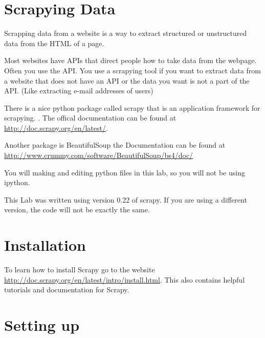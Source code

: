 
\section*{Scrapying Data}
Scrapping data from a website is a way to extract structured or unstructured data from the HTML of a page.

Most websites have APIs that direct people how to take data from the webpage. Often you use the API. You use a scrapying tool if you want to extract data from a website that does not have an API or the data you want is not a part of the API. (Like extracting e-mail addresses of users)

There is a nice python package called scrapy that is an application framework for scrapying. . The offical documentation can be found at \url{http://doc.scrapy.org/en/latest/}. 

Another package is BeautifulSoup the Documentation can be found at \url{http://www.crummy.com/software/BeautifulSoup/bs4/doc/}

\begin{info}
You will making and editing python files in this lab, so you will not be using ipython.
\end{info}

\begin{warn}
This Lab was written using version 0.22 of scrapy. 
If you are using a different version, the code will not be exactly the same.
\end{warn}

\section*{Installation}

To learn how to install Scrapy go to the website \url{http://doc.scrapy.org/en/latest/intro/install.html}. 
This also contains helpful tutorials and documentation for Scrapy.

\section*{Setting up}

\begin{comment}
\begin{problem}
Work thourgh the tutorial from the url above. You should turn in items.json as specified in the tutorial.
\end{problem}


When you run
\begin{lstlisting}
scrapy crawl dmoz -o items.json -t json
\end{lstlisting}
which generates a file \li{items.json} where all the scraped items are serialized in JSON. You can also store them in csv or xml by changing all the json to csv or xml.
For example
\begin{lstlisting}
scrapy crawl dmoz -o items.csv -t csv
\end{lstlisting}
generates a file \li{items.csv} where all the scraped items are stored in a csv file.
\end{comment}


